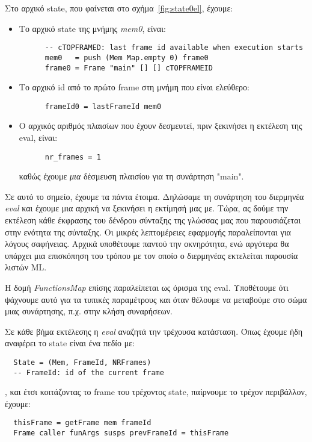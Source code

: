 \documentclass[diploma]{softlab-thesis}
\begin{document}
Στο αρχικό state, που φαίνεται στο σχήμα~\ref{fig:state0el}, έχουμε:
\begin{itemize}
  \item Το αρχικό state της μνήμης \textit{mem0}, είναι:
    \begin{verbatim}
      -- cTOPFRAMED: last frame id available when execution starts
      mem0   = push (Mem Map.empty 0) frame0 
      frame0 = Frame "main" [] [] cTOPFRAMEID 
    \end{verbatim}
  \item Το αρχικό id από το πρώτο frame στη μνήμη που είναι ελεύθερο:
    \begin{verbatim}
      frameId0 = lastFrameId mem0
    \end{verbatim}
  \item Ο αρχικός αριθμός πλαισίων που έχουν δεσμευτεί, πριν ξεκινήσει η εκτέλεση της eval, είναι:
    \begin{verbatim}
      nr_frames = 1
    \end{verbatim}
  καθώς έχουμε \textit{μια} δέσμευση πλαισίου για τη συνάρτηση "main".
\end{itemize}

Σε αυτό το σημείο, έχουμε τα πάντα έτοιμα. Δηλώσαμε τη συνάρτηση του διερμηνέα \textit{eval} και έχουμε μια αρχική
να ξεκινήσει η εκτίμησή μας με. Τώρα, ας δούμε την εκτέλεση κάθε έκφρασης του δένδρου σύνταξης της γλώσσας μας
που παρουσιάζεται στην ενότητα της σύνταξης. Οι μικρές λεπτομέρειες εφαρμογής παραλείπονται για λόγους σαφήνειας. Αρχικά υποθέτουμε παντού την οκνηρότητα,
ενώ αργότερα θα υπάρχει μια επισκόπηση του τρόπου με τον οποίο ο διερμηνέας εκτελείται παρουσία λιστών ML.

Η δομή \textit{FunctionsMap} επίσης παραλείπεται ως όρισμα της eval. Υποθέτουμε ότι ψάχνουμε αυτό για τα τυπικές παραμέτρους και όταν θέλουμε να μεταβούμε στο σώμα μιας συνάρτησης, π.χ. στην 
κλήση συναρήσεων.

Σε κάθε βήμα εκτέλεσης η \textit{eval} αναζητά την τρέχουσα κατάσταση. Όπως έχουμε ήδη αναφέρει το state είναι
ένα πεδίο με:

\begin{verbatim}
  State = (Mem, FrameId, NRFrames) 
  -- FrameId: id of the current frame
\end{verbatim}
, και έτσι κοιτάζοντας το frame του τρέχοντος state, παίρνουμε το τρέχον περιβάλλον, έχουμε:
\begin{verbatim}
  thisFrame = getFrame mem frameId 
  Frame caller funArgs susps prevFrameId = thisFrame 
\end{verbatim}
\end{document}
